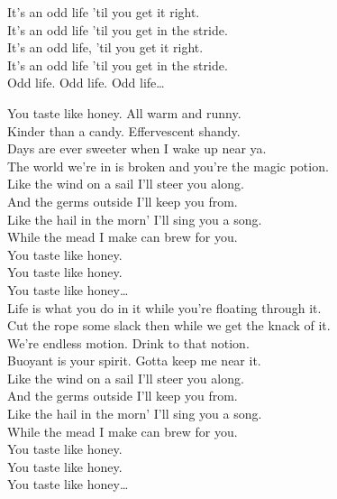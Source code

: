 It's an odd life 'til you get it right. \\
It's an odd life 'til you get in the stride. \\
It's an odd life, 'til you get it right. \\
It's an odd life 'til you get in the stride. \\

Odd life. Odd life. Odd life… \\




You taste like honey. All warm and runny. \\
Kinder than a candy. Effervescent shandy. \\
Days are ever sweeter when I wake up near ya. \\
The world we're in is broken and you're the magic potion. \\

Like the wind on a sail I'll steer you along. \\
And the germs outside I'll keep you from. \\
Like the hail in the morn' I'll sing you a song. \\
While the mead I make can brew for you. \\

You taste like honey. \\
You taste like honey. \\
You taste like honey… \\

Life is what you do in it while you're floating through it. \\
Cut the rope some slack then while we get the knack of it. \\
We're endless motion. Drink to that notion. \\
Buoyant is your spirit. Gotta keep me near it. \\

Like the wind on a sail I'll steer you along. \\
And the germs outside I'll keep you from. \\
Like the hail in the morn' I'll sing you a song. \\
While the mead I make can brew for you. \\

You taste like honey. \\
You taste like honey. \\
You taste like honey… \\

